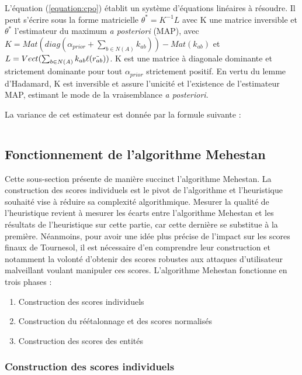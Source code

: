 L'équation (\ref{equation:cpo}) établit un système d'équations linéaires à résoudre. Il peut s'écrire sous la forme matricielle $\theta^*=K^{-1}L$ avec K une matrice inversible et $\theta^*$ l'estimateur du maximum \textit{a posteriori} (MAP), avec $K = Mat(diag(\alpha_{prior}+\sum_{b \in N(A)} k_{ab}))   - Mat(k_{ab}) $
et $L = Vect(\sum_{b \in N(A)} k_{ab}\ell(\Tilde{r_{ab}}))$.
K est une matrice à diagonale dominante et strictement dominante pour tout $\alpha_{prior}$ strictement positif. En vertu du lemme d'Hadamard, K est inversible et assure l'unicité et l'existence de l'estimateur MAP, estimant le mode de la vraisemblance \textit{a posteriori}.

La variance de cet estimateur est donnée par la formule suivante :

\begin{equation}
\end{equation}

\subsection{Fonctionnement de l'algorithme Mehestan}

Cette sous-section présente de manière succinct l'algorithme Mehestan. La construction des scores individuels est le pivot de l'algorithme et l'heuristique souhaité vise à réduire sa complexité algorithmique. Mesurer la qualité de l'heuristique revient à mesurer les écarts entre l'algorithme Mehestan et les résultats de l'heuristique sur cette partie, car cette dernière se substitue à la première. Néanmoins, pour avoir une idée plus précise de l'impact sur les scores finaux de Tournesol, il est nécessaire d'en comprendre leur construction et notamment la volonté d'obtenir des scores robustes aux attaques d'utilisateur malveillant voulant manipuler ces scores.
L'algorithme Mehestan fonctionne en trois phases :

\begin{enumerate}
    \item Construction des scores individuels
    \item Construction du réétalonnage et des scores normalisés
    \item Construction des scores des entités
\end{enumerate}
\subsubsection{Construction des scores individuels}

